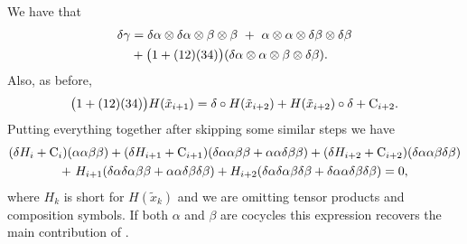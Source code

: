 \documentclass{amsart}
\begin{document}
We have that
\begin{align*}
	\delta\gamma &=
	\delta\alpha \otimes \delta\alpha \otimes \beta \otimes \beta \ +\
	\alpha \otimes \alpha \otimes \delta\beta \otimes \delta\beta \\ &+
	\big(1+(12)(34)\big)(\delta\alpha \otimes \alpha \otimes \beta \otimes \delta\beta).
\end{align*}
Also, as before,
\begin{equation*}
	\big(1+(12)(34)\big)H(\tilde{x}_{i+1}) =
	\delta \circ H(\tilde x_{i+2}) + H(\tilde x_{i+2}) \circ \delta + \mathrm{C}_{i+2}.
\end{equation*}
Putting everything together after skipping some similar steps we have
\begin{multline*}
	(\delta H_i + \mathrm{C}_i)(\alpha \alpha \beta \beta) +
	(\delta H_{i+1} + \mathrm{C}_{i+1})(\delta\alpha \alpha \beta \beta + \alpha \alpha \delta\beta \beta) +
	(\delta H_{i+2} + \mathrm{C}_{i+2})(\delta\alpha \alpha \beta \delta\beta) \\ +\
	H_{i+1}(\delta\alpha \delta\alpha \beta \beta + \alpha \alpha \delta\beta \delta\beta) +
	H_{i+2}(\delta\alpha \delta\alpha \beta \delta\beta + \delta\alpha \alpha \delta\beta \delta\beta) = 0,
\end{multline*}
where $H_k$ is short for $H(\tilde{x}_k)$ and we are omitting tensor products and composition symbols.
If both $\alpha$ and $\beta$ are cocycles this expression recovers the main contribution of \cite{medina2020cartan}.

\sloppy
\printbibliography
\end{document}
